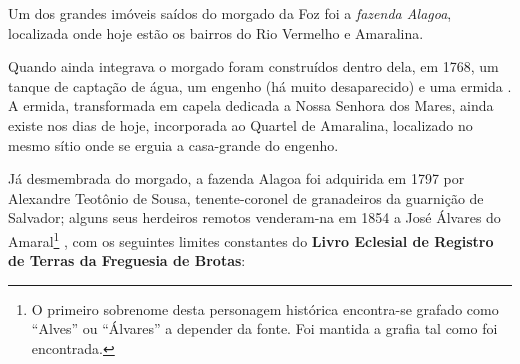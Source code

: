 Um dos grandes imóveis saídos do morgado da Foz foi a \textit{fazenda Alagoa}, localizada onde hoje estão os bairros do Rio Vermelho e Amaralina.

Quando ainda integrava o morgado foram construídos dentro dela, em 1768, um tanque de captação de água, um engenho (há muito desaparecido) e uma ermida \cite[p.~118]{campos_alagoa_1942}. A ermida, transformada em capela dedicada a Nossa Senhora dos Mares, ainda existe nos dias de hoje, incorporada ao Quartel de Amaralina, localizado no mesmo sítio onde se erguia a casa-grande do engenho.

Já desmembrada do morgado, a fazenda Alagoa foi adquirida em 1797 por Alexandre Teotônio de Sousa, tenente-coronel de granadeiros da guarnição de Salvador; alguns seus herdeiros remotos venderam-na em 1854 a José Álvares do Amaral\footnote{O primeiro sobrenome desta personagem histórica encontra-se grafado como ``Alves'' ou ``Álvares'' a depender da fonte. Foi mantida a grafia tal como foi encontrada.} \cite[p.~118]{campos_alagoa_1942}, com os seguintes limites constantes do \textbf{Livro Eclesial de Registro de Terras da Freguesia de Brotas}:

